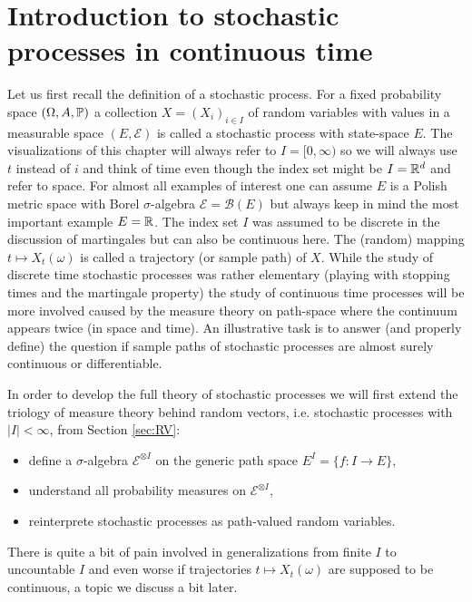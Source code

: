 \section[Stochastic processes in continuous time]{Introduction to stochastic processes in continuous time}\label{sec:SP}
	Let us first recall the definition of a stochastic process. For a fixed probability space $(\Omega, A, \P)$ a collection $X=(X_i)_{i\in I}$ of random variables with values in a measurable space $(E,\mathcal E)$ is called a stochastic process with state-space $E$. The visualizations of this chapter will always refer to $I=[0,\infty)$ so we will always use $t$ instead of $i$ and think of time even though the index set might be $I=\R^d$ and refer to space. For almost all examples of interest one can assume $E$ is a Polish metric space with Borel $\sigma$-algebra $\mathcal E=\mathcal B(E)$ but always keep in mind the most important example $E=\R$. The index set $I$ was assumed to be discrete in the discussion of martingales but can also be continuous here. The (random) mapping $t\mapsto X_t(\omega)$ is called a trajectory (or sample path) of $X$. While the study of discrete time stochastic processes was rather elementary (playing with stopping times and the martingale property) the study of continuous time processes will be more involved caused by the measure theory on path-space where the continuum appears twice (in space and time). An illustrative task is to answer (and properly define) the question if sample paths of stochastic processes are almost surely continuous or differentiable.\smallskip
	
In order to develop the full theory of stochastic processes we will first extend the triology of measure theory behind random vectors, i.e. stochastic processes with $|I|<\infty$, from Section \ref{sec:RV}:
\begin{itemize}
	\item define a $\sigma$-algebra $\mathcal E^{\otimes I}$ on the generic path space $E^I=\{f:I\to E\}$,
	\item understand all probability measures on $\mathcal E^{\otimes I}$,
	\item reinterprete stochastic processes as path-valued random variables.
\end{itemize}
There is quite a bit of pain involved in generalizations from finite $I$ to uncountable $I$ and even worse if trajectories $t\mapsto X_t(\omega)$ are supposed to be continuous, a topic we discuss a bit later.

